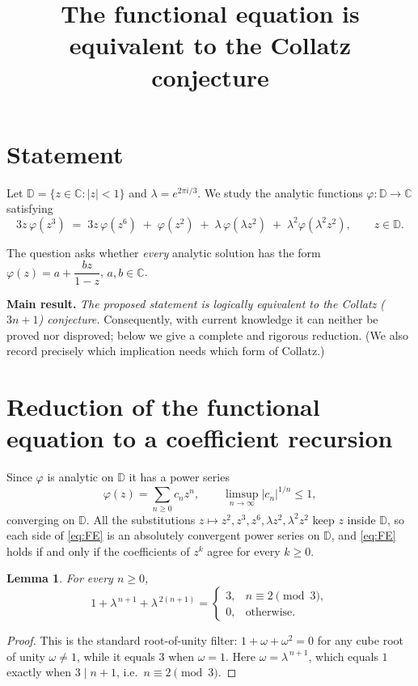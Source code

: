 \documentclass{amsart}
\newtheorem{lemma}{Lemma}
\theoremstyle{remark}
\begin{document}
\title{The functional equation is equivalent to the Collatz conjecture}
\maketitle

\section*{Statement}
Let $\mathbb{D} = \{z \in \mathbb{C} : |z| < 1\}$ and $\lambda = e^{2\pi i/3}$.
We study the analytic functions $\varphi:\mathbb{D}\to\mathbb{C}$ satisfying
\begin{equation}\label{eq:FE}
3z\,\varphi(z^3) \;=\; 3z\,\varphi(z^6) \;+\; \varphi(z^2) \;+\; \lambda\,\varphi(\lambda z^2) \;+\; \lambda^2 \varphi(\lambda^2 z^2),
\qquad z\in\mathbb{D}.
\end{equation}

The question asks whether \emph{every} analytic solution has the form
$\varphi(z)=a+\dfrac{bz}{1-z}$, $a,b\in\mathbb{C}$.

\medskip
\noindent\textbf{Main result.} \emph{The proposed statement is logically equivalent to the
Collatz ($3n+1$) conjecture.} Consequently, with current knowledge it can neither be proved
nor disproved; below we give a complete and rigorous reduction. (We also record precisely
which implication needs which form of Collatz.)

\section{Reduction of the functional equation to a coefficient recursion}

Since $\varphi$ is analytic on $\mathbb{D}$ it has a power series
\begin{equation}\label{eq:series}
\varphi(z)=\sum_{n\ge 0}c_n z^n,\qquad \limsup_{n\to\infty}|c_n|^{1/n}\le 1,
\end{equation}
converging on $\mathbb{D}$. All the substitutions $z\mapsto z^2,z^3,z^6,\lambda z^2,\lambda^2 z^2$
keep $z$ inside $\mathbb{D}$, so each side of \eqref{eq:FE} is an absolutely convergent power
series on $\mathbb{D}$, and \eqref{eq:FE} holds if and only if the coefficients of $z^k$ agree
for every $k\ge 0$.

\begin{lemma}\label{lem:sym}
For every $n\ge 0$,
\[
1+\lambda^{\,n+1}+\lambda^{\,2(n+1)}=
\begin{cases}
3,& n\equiv 2 \pmod 3,\\[2pt]
0,& \text{otherwise.}
\end{cases}
\]
\end{lemma}
\begin{proof}
This is the standard root-of-unity filter: $1+\omega+\omega^2=0$ for any cube root of unity
$\omega\ne 1$, while it equals $3$ when $\omega=1$. Here $\omega=\lambda^{\,n+1}$, which equals
$1$ exactly when $3\mid n+1$, i.e.\ $n\equiv 2\pmod 3$.
\end{proof}
\end{document}
